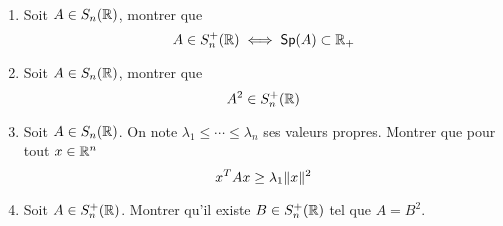 \begin{td-exo}\,
    \begin{enumerate}[label=(\alph*)] %
        \item Soit \(A\in S_n(\mathbb{R})\), montrer que
        \begin{equation*}
            A\in S_n^+(\mathbb{R}) \iff \operatorname{\mathsf{Sp}}(A) \subset \mathbb{R}_+
        \end{equation*}

        \item Soit \(A\in S_n(\mathbb{R})\), montrer que
        \begin{equation*}
            A^2\in S_n^+(\mathbb{R})
        \end{equation*}

        \item Soit \(A\in S_n(\mathbb{R})\). On note \(\lambda_1\leq \cdots \leq \lambda_n\) ses valeurs propres.
        Montrer que pour tout \(x\in \mathbb{R}^n\)
        \begin{equation*}
            x^T A x \geq \lambda_1 \mathopen{}\left\|x\right\|\mathclose{}^2
        \end{equation*}

        \item Soit \(A\in S_n^+(\mathbb{R})\). Montrer qu'il existe \(B\in S_n^+(\mathbb{R})\) tel que
        \(A = B^2\).
    \end{enumerate}
\end{td-exo}
